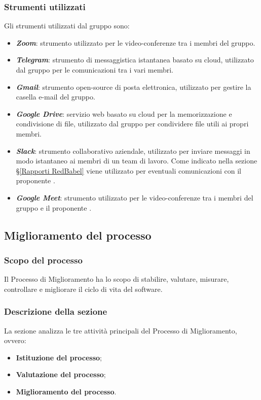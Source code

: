 \subsubsection{Strumenti utilizzati}
Gli strumenti utilizzati dal gruppo sono:
\begin{itemize}
	\item \textbf{\textit{Zoom}}: strumento utilizzato per le video-conferenze tra i membri del gruppo.
	\item \textbf{\textit{Telegram}}: strumento di messaggistica istantanea basato su cloud, utilizzato dal gruppo \Gruppo per le comunicazioni tra i vari membri.
	\item \textbf{\textit{Gmail}}: strumento open-source di posta elettronica, utilizzato per gestire la casella e-mail del gruppo.
	\item \textbf{\textit{Google Drive}}: servizio web basato su cloud per la memorizzazione e condivisione di file, utilizzato dal gruppo per condividere file utili ai propri membri.
	\item \textbf{\textit{Slack}}: strumento collaborativo aziendale, utilizzato per inviare messaggi in modo istantaneo ai membri di un team di lavoro. Come indicato nella sezione \S\ref{Rapporti RedBabel} viene utilizzato per eventuali comunicazioni con il proponente \Proponente.
	\item \textbf{\textit{Google Meet}}: strumento utilizzato per le video-conferenze tra i membri del gruppo e il proponente \Proponente.
\end{itemize}

\subsection{Miglioramento del processo}
\subsubsection{Scopo del processo}
Il Processo di Miglioramento ha lo scopo di stabilire, valutare, misurare, controllare e migliorare il ciclo di vita del software.
\subsubsection{Descrizione della sezione}
La sezione analizza le tre attività principali del Processo di Miglioramento, ovvero:
\begin{itemize}
	\item \textbf{Istituzione del processo};	
	\item \textbf{Valutazione del processo};
	\item \textbf{Miglioramento del processo}.
\end{itemize}
